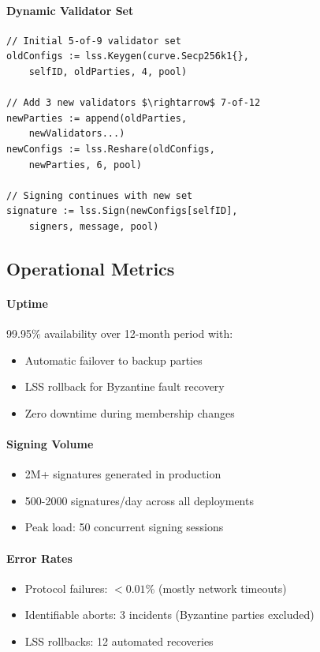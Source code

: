 \paragraph{Dynamic Validator Set}
\begin{verbatim}
// Initial 5-of-9 validator set
oldConfigs := lss.Keygen(curve.Secp256k1{},
    selfID, oldParties, 4, pool)

// Add 3 new validators $\rightarrow$ 7-of-12
newParties := append(oldParties,
    newValidators...)
newConfigs := lss.Reshare(oldConfigs,
    newParties, 6, pool)

// Signing continues with new set
signature := lss.Sign(newConfigs[selfID],
    signers, message, pool)
\end{verbatim}

\subsection{Operational Metrics}

\paragraph{Uptime} 99.95\% availability over 12-month period with:
\begin{itemize}
\item Automatic failover to backup parties
\item LSS rollback for Byzantine fault recovery
\item Zero downtime during membership changes
\end{itemize}

\paragraph{Signing Volume}
\begin{itemize}
\item 2M+ signatures generated in production
\item 500-2000 signatures/day across all deployments
\item Peak load: 50 concurrent signing sessions
\end{itemize}

\paragraph{Error Rates}
\begin{itemize}
\item Protocol failures: $< 0.01\%$ (mostly network timeouts)
\item Identifiable aborts: 3 incidents (Byzantine parties excluded)
\item LSS rollbacks: 12 automated recoveries
\end{itemize}


